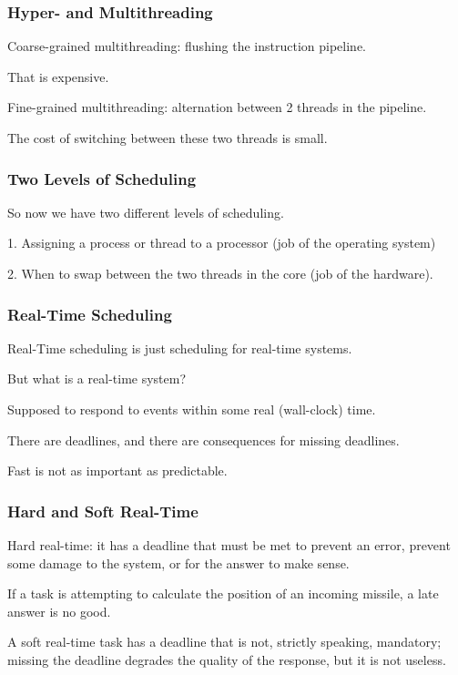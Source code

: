 \begin{frame}
\frametitle{Hyper- and Multithreading}

Coarse-grained multithreading: flushing the instruction pipeline. 

That is expensive. 

Fine-grained multithreading: alternation between 2 threads in the pipeline. 

The cost of switching between these two threads is small.

\end{frame}

\begin{frame}
\frametitle{Two Levels of Scheduling}

So now we have two different levels of scheduling.

1. Assigning a process or thread to a processor (job of the operating system)

2. When to swap between the two threads in the core (job of the hardware). 

\end{frame}

\begin{frame}
\frametitle{Real-Time Scheduling}

Real-Time scheduling is just scheduling for real-time systems.

But what is a real-time system?

Supposed to respond to events within some real (wall-clock) time. 

There are deadlines, and there are consequences for missing deadlines. 

Fast is not as important as predictable.

\end{frame}

\begin{frame}
\frametitle{Hard and Soft Real-Time}

\alert{Hard real-time}: it has a deadline that must be met to prevent an error, prevent some damage to the system, or for the answer to make sense. 

If a task is attempting to calculate the position of an incoming missile, a late answer is no good. 

A \alert{soft real-time} task has a deadline that is not, strictly speaking, mandatory; missing the deadline degrades the quality of the response, but it is not useless.


\end{frame}

